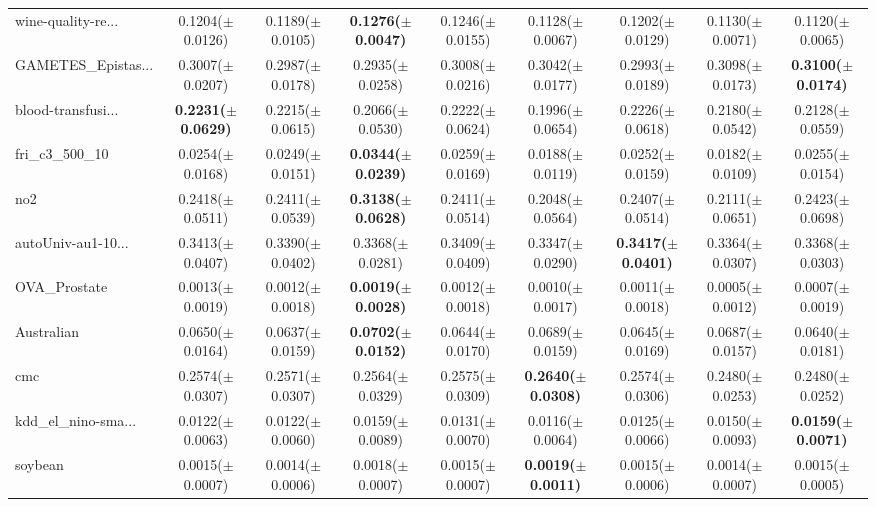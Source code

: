 \begin{longtable}{lcccccccc}
wine-quality-re... & 0.1204($\pm$0.0126) & 0.1189($\pm$0.0105) & \textbf{0.1276($\pm$0.0047)} & 0.1246($\pm$0.0155) & 0.1128($\pm$0.0067) & 0.1202($\pm$0.0129) & 0.1130($\pm$0.0071) & 0.1120($\pm$0.0065) \\
GAMETES\_Epistas... & 0.3007($\pm$0.0207) & 0.2987($\pm$0.0178) & 0.2935($\pm$0.0258) & 0.3008($\pm$0.0216) & 0.3042($\pm$0.0177) & 0.2993($\pm$0.0189) & 0.3098($\pm$0.0173) & \textbf{0.3100($\pm$0.0174)} \\
blood-transfusi... & \textbf{0.2231($\pm$0.0629)} & 0.2215($\pm$0.0615) & 0.2066($\pm$0.0530) & 0.2222($\pm$0.0624) & 0.1996($\pm$0.0654) & 0.2226($\pm$0.0618) & 0.2180($\pm$0.0542) & 0.2128($\pm$0.0559) \\
fri\_c3\_500\_10 & 0.0254($\pm$0.0168) & 0.0249($\pm$0.0151) & \textbf{0.0344($\pm$0.0239)} & 0.0259($\pm$0.0169) & 0.0188($\pm$0.0119) & 0.0252($\pm$0.0159) & 0.0182($\pm$0.0109) & 0.0255($\pm$0.0154) \\
no2 & 0.2418($\pm$0.0511) & 0.2411($\pm$0.0539) & \textbf{0.3138($\pm$0.0628)} & 0.2411($\pm$0.0514) & 0.2048($\pm$0.0564) & 0.2407($\pm$0.0514) & 0.2111($\pm$0.0651) & 0.2423($\pm$0.0698) \\
autoUniv-au1-10... & 0.3413($\pm$0.0407) & 0.3390($\pm$0.0402) & 0.3368($\pm$0.0281) & 0.3409($\pm$0.0409) & 0.3347($\pm$0.0290) & \textbf{0.3417($\pm$0.0401)} & 0.3364($\pm$0.0307) & 0.3368($\pm$0.0303) \\
OVA\_Prostate & 0.0013($\pm$0.0019) & 0.0012($\pm$0.0018) & \textbf{0.0019($\pm$0.0028)} & 0.0012($\pm$0.0018) & 0.0010($\pm$0.0017) & 0.0011($\pm$0.0018) & 0.0005($\pm$0.0012) & 0.0007($\pm$0.0019) \\
Australian & 0.0650($\pm$0.0164) & 0.0637($\pm$0.0159) & \textbf{0.0702($\pm$0.0152)} & 0.0644($\pm$0.0170) & 0.0689($\pm$0.0159) & 0.0645($\pm$0.0169) & 0.0687($\pm$0.0157) & 0.0640($\pm$0.0181) \\
cmc & 0.2574($\pm$0.0307) & 0.2571($\pm$0.0307) & 0.2564($\pm$0.0329) & 0.2575($\pm$0.0309) & \textbf{0.2640($\pm$0.0308)} & 0.2574($\pm$0.0306) & 0.2480($\pm$0.0253) & 0.2480($\pm$0.0252) \\
kdd\_el\_nino-sma... & 0.0122($\pm$0.0063) & 0.0122($\pm$0.0060) & 0.0159($\pm$0.0089) & 0.0131($\pm$0.0070) & 0.0116($\pm$0.0064) & 0.0125($\pm$0.0066) & 0.0150($\pm$0.0093) & \textbf{0.0159($\pm$0.0071)} \\
soybean & 0.0015($\pm$0.0007) & 0.0014($\pm$0.0006) & 0.0018($\pm$0.0007) & 0.0015($\pm$0.0007) & \textbf{0.0019($\pm$0.0011)} & 0.0015($\pm$0.0006) & 0.0014($\pm$0.0007) & 0.0015($\pm$0.0005) \\

\end{longtable}

